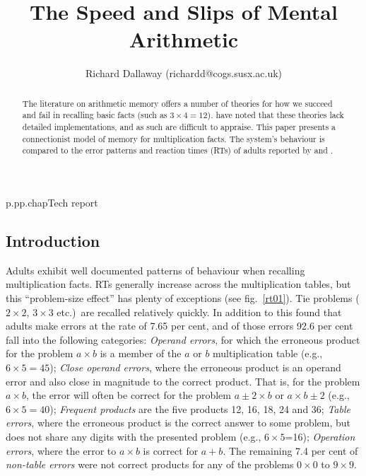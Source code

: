 \def\x#1#2{\mbox{$#1\times#2$}}
\def\X#1{\mbox{$\times#1$}}
%
{p.}{pp.}{chap}{Tech report}




\title{The Speed and Slips of Mental Arithmetic}
\author{Richard Dallaway (richardd@cogs.susx.ac.uk)}
\showwherepublished
\maketitle

\begin{abstract}
The literature on arithmetic memory offers a number of theories for how we
succeed and fail in recalling basic facts (such as $\x34=12$).
 have noted that these theories lack detailed
implementations, and as such are difficult to appraise.  This paper
presents a connectionist model of memory for multiplication facts. The
system's behaviour is compared to the error patterns and reaction times
(RTs) of adults reported by  and .
\end{abstract}

\subsection*{Introduction}



Adults exhibit well documented patterns of behaviour when recalling
multiplication facts. RTs generally increase across the multiplication
tables, but this ``problem-size effect'' has plenty of exceptions (see
fig.~\ref{rt01}). Tie problems (\x22, \x33 etc.)\  are
recalled relatively quickly. In addition to this  found that
adults make errors at the rate of 7.65 per cent, and of those errors 92.6
per cent fall into the following categories:
{\em Operand errors}, for which the
erroneous product for the problem \x a b is a member of the $a$ or $b$
multiplication table (e.g., $\x65=45$);
{\em Close operand
errors}, where the erroneous product is an operand error and also close in
magnitude to the correct product. That is, for the problem \x a b, the
error will often be correct for the problem $a\pm2\times b$ or $a\times
b\pm2$ (e.g., $\x65=40$);
{\em Frequent products} are
the five products 12, 16, 18, 24 and 36;
{\em Table errors},
where the erroneous product is the correct answer to some problem, but does
not share any digits with the presented problem (e.g., \x65=16);
{\em Operation errors}, where the error to \x a b is correct
for $a+b$.
The remaining 7.4 per cent of {\em non-table errors} were not correct
products for any of the problems \x00 to \x99.

